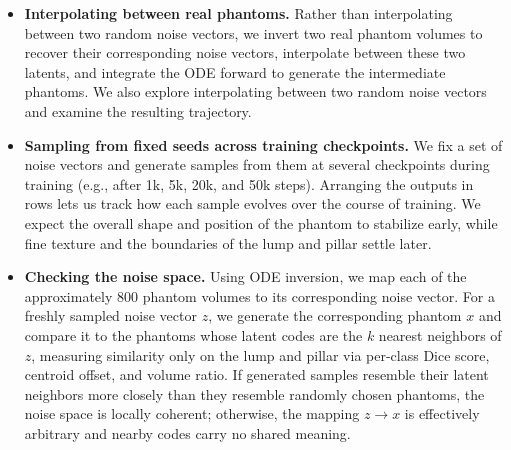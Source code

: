 \documentclass[11pt,a4paper]{article}
\begin{document}
\begin{itemize}
    \item \textbf{Interpolating between real phantoms.} Rather than interpolating between two random noise vectors, we invert two real phantom volumes to recover their corresponding noise vectors, interpolate between these two latents, and integrate the ODE forward to generate the intermediate phantoms. We also explore interpolating between two random noise vectors and examine the resulting trajectory.

    \item \textbf{Sampling from fixed seeds across training checkpoints.} We fix a set of noise vectors and generate samples from them at several checkpoints during training (e.g., after 1k, 5k, 20k, and 50k steps). Arranging the outputs in rows lets us track how each sample evolves over the course of training. We expect the overall shape and position of the phantom to stabilize early, while fine texture and the boundaries of the lump and pillar settle later.

    \item \textbf{Checking the noise space.} Using ODE inversion, we map each of the approximately 800 phantom volumes to its corresponding noise vector. For a freshly sampled noise vector $z$, we generate the corresponding phantom $x$ and compare it to the phantoms whose latent codes are the $k$ nearest neighbors of $z$, measuring similarity only on the lump and pillar via per-class Dice score, centroid offset, and volume ratio. If generated samples resemble their latent neighbors more closely than they resemble randomly chosen phantoms, the noise space is locally coherent; otherwise, the mapping $z \to x$ is effectively arbitrary and nearby codes carry no shared meaning.
\end{itemize}
\end{document}
